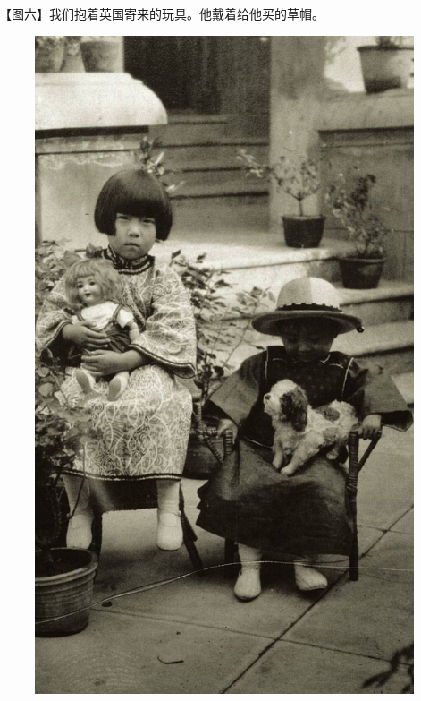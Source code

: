\clearpage
\par 【图六】我们抱着英国寄来的玩具。他戴着给他买的草帽。
\begin{figure}[htb]
    \centering %
    \includegraphics[scale=0.4]{picture/对照记6.jpeg}
\end{figure}


